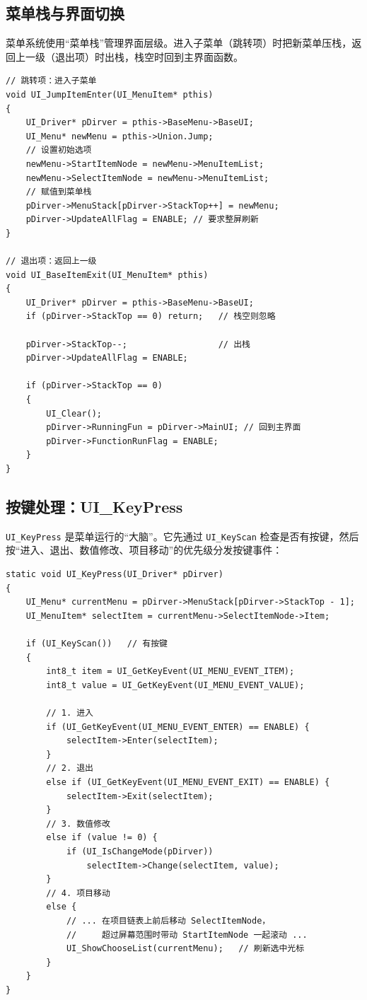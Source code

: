 \subsection{菜单栈与界面切换}

菜单系统使用“菜单栈”管理界面层级。进入子菜单（跳转项）时把新菜单压栈，返回上一级（退出项）时出栈，栈空时回到主界面函数。

\begin{lstlisting}[style=c]
// 跳转项：进入子菜单
void UI_JumpItemEnter(UI_MenuItem* pthis)
{
    UI_Driver* pDirver = pthis->BaseMenu->BaseUI;
    UI_Menu* newMenu = pthis->Union.Jump;
    // 设置初始选项
    newMenu->StartItemNode = newMenu->MenuItemList;
    newMenu->SelectItemNode = newMenu->MenuItemList;
    // 赋值到菜单栈
    pDirver->MenuStack[pDirver->StackTop++] = newMenu;
    pDirver->UpdateAllFlag = ENABLE; // 要求整屏刷新
}

// 退出项：返回上一级
void UI_BaseItemExit(UI_MenuItem* pthis)
{
    UI_Driver* pDirver = pthis->BaseMenu->BaseUI;
    if (pDirver->StackTop == 0) return;   // 栈空则忽略

    pDirver->StackTop--;                  // 出栈
    pDirver->UpdateAllFlag = ENABLE;

    if (pDirver->StackTop == 0)
    {
        UI_Clear();
        pDirver->RunningFun = pDirver->MainUI; // 回到主界面
        pDirver->FunctionRunFlag = ENABLE;
    }
}
\end{lstlisting}

\subsection{按键处理：UI\_KeyPress}

\texttt{UI\_KeyPress} 是菜单运行的“大脑”。它先通过 \texttt{UI\_KeyScan} 检查是否有按键，然后按“进入、退出、数值修改、项目移动”的优先级分发按键事件：

\begin{lstlisting}[style=c]
static void UI_KeyPress(UI_Driver* pDirver)
{
    UI_Menu* currentMenu = pDirver->MenuStack[pDirver->StackTop - 1];
    UI_MenuItem* selectItem = currentMenu->SelectItemNode->Item;

    if (UI_KeyScan())   // 有按键
    {
        int8_t item = UI_GetKeyEvent(UI_MENU_EVENT_ITEM);
        int8_t value = UI_GetKeyEvent(UI_MENU_EVENT_VALUE);

        // 1. 进入
        if (UI_GetKeyEvent(UI_MENU_EVENT_ENTER) == ENABLE) {
            selectItem->Enter(selectItem);
        }
        // 2. 退出
        else if (UI_GetKeyEvent(UI_MENU_EVENT_EXIT) == ENABLE) {
            selectItem->Exit(selectItem);
        }
        // 3. 数值修改
        else if (value != 0) {
            if (UI_IsChangeMode(pDirver))
                selectItem->Change(selectItem, value);
        }
        // 4. 项目移动
        else {
            // ... 在项目链表上前后移动 SelectItemNode，
            //     超过屏幕范围时带动 StartItemNode 一起滚动 ...
            UI_ShowChooseList(currentMenu);   // 刷新选中光标
        }
    }
}
\end{lstlisting}

